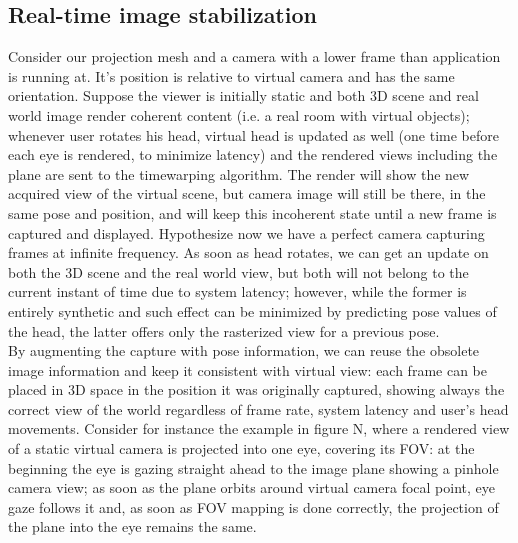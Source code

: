 \subsection{Real-time image stabilization}
Consider our projection mesh and a camera with a lower frame than application is running at. It’s position is relative to virtual camera and has the same orientation. Suppose the viewer is initially static and both 3D scene and real world image render coherent content (i.e. a real room with virtual objects); whenever user rotates his head, virtual head is updated as well (one time before each eye is rendered, to minimize latency) and the rendered views including the plane are sent to the timewarping algorithm. The render will show the new acquired view of the virtual scene, but camera image will still be there, in the same pose and position, and will keep this incoherent state until a new frame is captured and displayed. Hypothesize now we have a perfect camera capturing frames at infinite frequency. As soon as head rotates, we can get an update on both the 3D scene and the real world view, but both will not belong to the current instant of time due to system latency; however, while the former is entirely synthetic and such effect can be minimized by predicting pose values of the head, the latter offers only the rasterized view for a previous pose.\\
By augmenting the capture with pose information, we can reuse the obsolete image information and keep it consistent with virtual view: each frame can be placed in 3D space in the position it was originally captured, showing always the correct view of the world regardless of frame rate, system latency and user’s head movements. Consider for instance the example in figure N, where a rendered view of a static virtual camera is projected into one eye, covering its FOV: at the beginning the eye is gazing straight ahead to the image plane showing a pinhole camera view; as soon as the plane orbits around virtual camera focal point, eye gaze follows it and, as soon as FOV mapping is done correctly, the projection of the plane into the eye remains the same.\\
